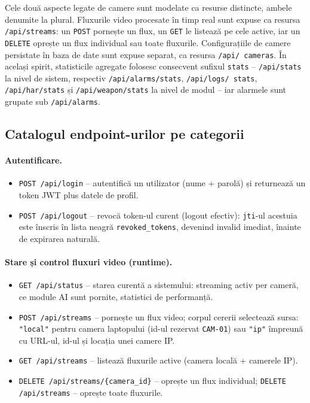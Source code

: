 \documentclass[../../main.tex]{subfiles}
\begin{document}
Cele două aspecte legate de camere sunt modelate ca resurse distincte, ambele denumite la plural. Fluxurile video procesate în timp real sunt expuse ca resursa \texttt{/api/streams}: un \texttt{POST} pornește un flux, un \texttt{GET} le listează pe cele active, iar un \texttt{DELETE} oprește un flux individual sau toate fluxurile. Configurațiile de camere persistate în baza de date sunt expuse separat, ca resursa \texttt{/api/ \linebreak cameras}. În același spirit, statisticile agregate folosesc consecvent sufixul \texttt{stats} -- \texttt{/api/stats} la nivel de sistem, respectiv \texttt{/api/alarms/stats}, \texttt{/api/logs/ \linebreak stats}, \texttt{/api/har/stats} și \texttt{/api/weapon/stats} la nivel de modul -- iar alarmele sunt grupate sub \texttt{/api/alarms}.

\subsection{Catalogul endpoint-urilor pe categorii}

\paragraph*{Autentificare.}
\begin{itemize}
    \item \texttt{POST /api/login} -- autentifică un utilizator (nume + parolă) și returnează un token JWT plus datele de profil.
    \item \texttt{POST /api/logout} -- revocă token-ul curent (logout efectiv): \texttt{jti}-ul acestuia este înscris în lista neagră \texttt{revoked\_tokens}, devenind invalid imediat, înainte de expirarea naturală.
\end{itemize}

\paragraph*{Stare și control fluxuri video (runtime).}
\begin{itemize}
    \item \texttt{GET /api/status} -- starea curentă a sistemului: streaming activ per cameră, ce module AI sunt pornite, statistici de performanță.
    \item \texttt{POST /api/streams} -- pornește un flux video; corpul cererii selectează sursa: \texttt{"local"} pentru camera laptopului (id-ul rezervat \texttt{CAM-01}) sau \texttt{"ip"} împreună cu URL-ul, id-ul și locația unei camere IP.
    \item \texttt{GET /api/streams} -- listează fluxurile active (camera locală + camerele IP).
    \item \texttt{DELETE /api/streams/\{camera\_id\}} -- oprește un flux individual; \linebreak \texttt{DELETE /api/streams} -- oprește toate fluxurile.
\end{itemize}
\end{document}
